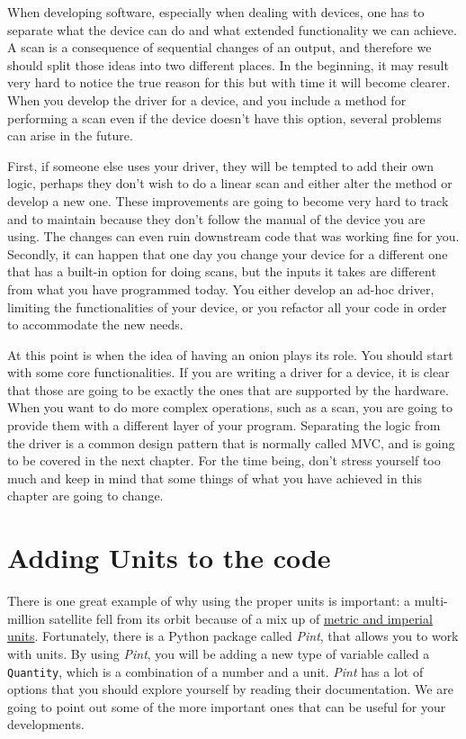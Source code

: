 When developing software, especially when dealing with devices, one has
to separate what the device can do and what extended functionality we
can achieve. A scan is a consequence of sequential changes of an output,
and therefore we should split those ideas into two different places. In
the beginning, it may result very hard to notice the true reason for
this but with time it will become clearer. When you develop the driver
for a device, and you include a method for performing a scan even if the
device doesn't have this option, several problems can arise in
the future.

First, if someone else uses your driver, they will be tempted to add
their own logic, perhaps they don't wish to do a linear scan and either
alter the method or develop a new one. These improvements are going to
become very hard to track and to maintain because they don't follow the
manual of the device you are using. The changes can even ruin downstream
code that was working fine for you. Secondly, it can happen that one day
you change your device for a different one that has a built-in option
for doing scans, but the inputs it takes are different from what you
have programmed today. You either develop an ad-hoc driver, limiting the
functionalities of your device, or you refactor all your code in order
to accommodate the new needs.

At this point is when the idea of having an onion plays its role. You
should start with some core functionalities. If you are writing a driver
for a device, it is clear that those are going to be exactly the ones
that are supported by the hardware. When you want to do more complex
operations, such as a scan, you are going to provide them with a
different layer of your program. Separating the logic from the driver is
a common design pattern that is normally called {MVC}, and is going to
be covered in the next chapter. For the time being, don't stress
yourself too much and keep in mind that some things of what you have
achieved in this chapter are going to change.

\section{Adding Units to the code}\label{adding-units-to-thecode}

There is one great example of why using the proper units is important: a
multi-million satellite fell from its orbit because of a mix up of
\href{http://articles.latimes.com/1999/oct/01/news/mn-17288}{metric and
imperial units}. Fortunately, there is a Python package called
\emph{Pint}, that allows you to work with units. By using \emph{Pint},
you will be adding a new type of variable called a \texttt{Quantity},
which is a combination of a number and a unit. \emph{Pint} has a lot of
options that you should explore yourself by reading their documentation.
We are going to point out some of the more important ones that can be
useful for your developments.

